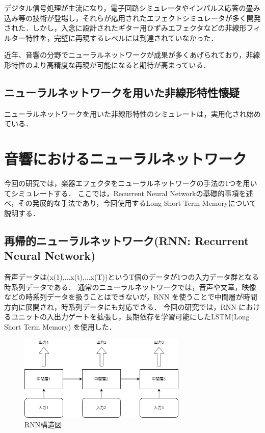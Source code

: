 \documentclass{jreport}		%
\begin{document}
デジタル信号処理が主流になり，電子回路シミュレータやインパルス応答の畳み込み等の技術が登場し，それらが応用されたエフェクトシミュレータが多く開発された．しかし，入念に設計されたギター用ひずみエフェクタなどの非線形フィルター特性を，完璧に再現するレベルには到達されていなかった．

近年、音響の分野でニューラルネットワークが成果が多くあげられており，非線形特性のより高精度な再現が可能になると期待が高まっている．

\section{ニューラルネットワークを用いた非線形特性懐疑}
ニューラルネットワークを用いた非線形特性のシミュレートは，実用化され始めている．

\chapter{音響におけるニューラルネットワーク}
今回の研究では，楽器エフェクタをニューラルネットワークの手法の1つを用いてシミュレートする．
ここでは，Recurrent Neural Networkの基礎的事項を述べ，その発展的な手法であり，今回使用するLong Short-Term Memoryについて説明する．

\section{再帰的ニューラルネットワーク(RNN: Recurrent Neural Network)}
音声データは(x(1),...x(t),...x(T))というT個のデータが1つの入力データ群となる時系列データである．
通常のニューラルネットワークでは，音声や文章，映像などの時系列データを扱うことはできないが，RNN を使うことで中間層が時間方向に展開され，時系列データにも対応できる．
今回の研究では，RNN におけるユニットの入出力ゲートを拡張し，長期依存を学習可能にしたLSTM(Long Short Term Memory) を使用した．

\begin{figure}[htbp]
 \begin{center}
  \includegraphics[width=80mm]{RNN.png}
 \end{center}
 \caption{RNN構造図}
 \label{fig:one}
\end{figure}
\end{document}
